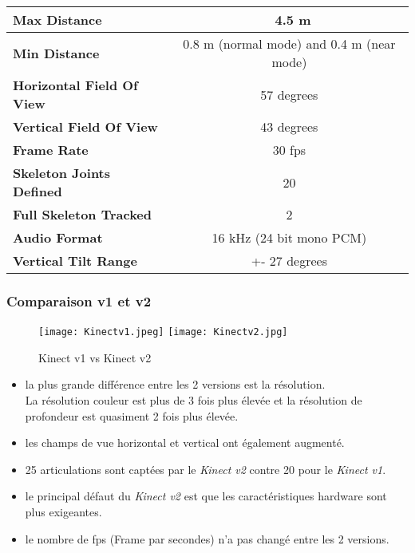 \begin{center}
	\begin{tabular}{| l | c |}
	\hline
		\textbf{Max Distance} & ~4.5 m \\ \hline
		\textbf{Min Distance} & 0.8 m (normal mode) and 0.4 m (near mode)\\ \hline
		\textbf{Horizontal Field Of View} & 57 degrees \\ \hline
		\textbf{Vertical Field Of View} & 43 degrees \\ \hline
		\textbf{Frame Rate} & 30 fps \\ \hline
		\textbf{Skeleton Joints Defined} & 20 \\ \hline
		\textbf{Full Skeleton Tracked} & 2 \\ \hline
		\textbf{Audio Format} & 16 kHz (24 bit mono PCM) \\ \hline
		\textbf{Vertical Tilt Range} & +- 27 degrees \\
		\hline
	\end{tabular}
\end{center}


\subsubsection{Comparaison v1 et v2}

\begin{figure}[h]
	\texttt{[image: Kinectv1.jpeg]}
	\texttt{[image: Kinectv2.jpg]}
	\caption{\label{Kinectv1v2} Kinect v1 vs Kinect v2}
\end{figure}
\begin{itemize}
	\item la plus grande différence entre les 2 versions est la résolution.\\
	 La résolution couleur est plus de 3 fois plus élevée et la résolution de profondeur est quasiment 2 fois plus élevée.
	\item les champs de vue horizontal et vertical ont également augmenté. 
	\item 25 articulations sont captées par le \textit{Kinect v2} contre 20 pour le \textit{Kinect v1}.
	\item le principal défaut du \textit{Kinect v2} est que les caractéristiques hardware sont plus exigeantes.
	\item le nombre de fps (Frame par secondes) n'a pas changé entre les 2 versions. 
\end{itemize}

